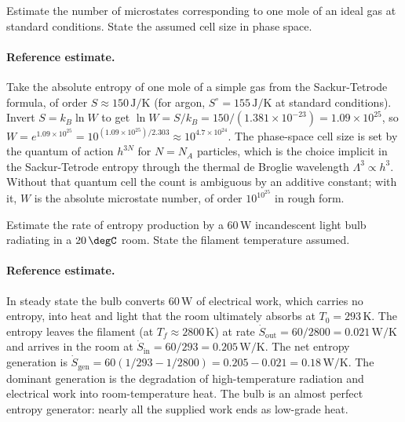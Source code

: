 \begin{exercise}
Estimate the number of microstates corresponding to one mole of an
ideal gas at standard conditions. State the assumed cell size in
phase space.

\paragraph{Reference estimate.} Take the absolute entropy of one mole
of a simple gas from the Sackur-Tetrode formula, of order $S \approx
150\,\si{\joule\per\kelvin}$ (for argon, $S^\circ = 155\,
\si{\joule\per\kelvin}$ at standard conditions). Invert
$S = k_B \ln W$ to get
$\ln W = S/k_B = 150/(1.381 \times 10^{-23}) = 1.09 \times 10^{25}$,
so $W = e^{1.09 \times 10^{25}} = 10^{(1.09 \times 10^{25})/2.303}
\approx 10^{4.7 \times 10^{24}}$. The phase-space cell size is set by
the quantum of action $h^{3N}$ for $N = N_A$ particles, which is the
choice implicit in the Sackur-Tetrode entropy through the thermal de
Broglie wavelength $\Lambda^3 \propto h^3$. Without that quantum cell
the count is ambiguous by an additive constant; with it, $W$ is the
absolute microstate number, of order $10^{10^{25}}$ in rough form.
\end{exercise}

\begin{exercise}
Estimate the rate of entropy production by a $60\,\text{W}$
incandescent light bulb radiating in a $20\,\degC$ room. State the
filament temperature assumed.

\paragraph{Reference estimate.} In steady state the bulb converts
$60\,\text{W}$ of electrical work, which carries no entropy, into heat
and light that the room ultimately absorbs at $T_0 = 293\,\si{\kelvin}$.
The entropy leaves the filament (at $T_f \approx 2800\,\si{\kelvin}$)
at rate $\dot S_{\text{out}} = 60/2800 = 0.021\,\text{W}/\si{\kelvin}$
and arrives in the room at $\dot S_{\text{in}} = 60/293 =
0.205\,\text{W}/\si{\kelvin}$. The net entropy generation is
$\dot S_{\text{gen}} = 60(1/293 - 1/2800) =
0.205 - 0.021 = 0.18\,\text{W}/\si{\kelvin}$. The dominant generation is
the degradation of high-temperature radiation and electrical work into
room-temperature heat. The bulb is an almost perfect entropy generator:
nearly all the supplied work ends as low-grade heat.
\end{exercise}

